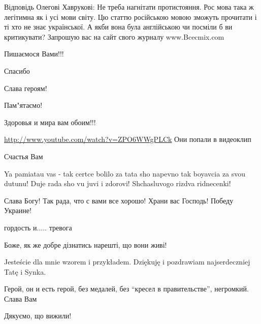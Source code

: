  
 
 
 
 


Відповідь Олегові Хаврукові: Не треба нагнітати протистояння. Рос мова така ж
легітимна як і усі мови світу. Цю статтю російською мовою зможуть прочитати і
ті хто не знає української. А якби вона була англійською чи посміли б ви
критикувати?  Запрошую вас на сайт свого журналу www.Bcecmix.com

Пишаємося Вами!!!

Спасибо

Слава героям!

Пам"ятаємо!

Здоровья и мира вам обоим!!!


\url{http://www.youtube.com/watch?v=ZPO6WWgPLCk} Они попали в видеоклип

Счастья Вам


Ya pamiatau vas - tak certce bolilo za tata sho napevno tak boyavcia za svou
dutunu! Duje rada sho vu juvi i zdorovi! Shchasluvogo rizdva ridnecenki!

Слава Богу! Так рада, что с вами все хорошо!
Храни вас Господь! Победу Украине!


гордость и..... тревога


Боже, як же добре дізнатись нарешті, що вони живі!


Jesteście dla mnie wzorem i przykładem. Dziękuję i pozdrawiam najserdeczniej
Tatę i Synka.


Герой, он и есть герой, без медалей, без \enquote{кресел в правительстве},
негромкий. Слава Вам

Дякуємо, що вижили!

